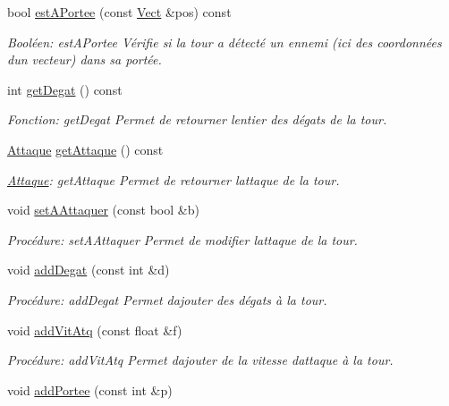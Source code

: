 \begin{DoxyCompactItemize}
bool \hyperlink{classTour_ad9f4d42370374f373f48f7d0fb36559a}{est\+A\+Portee} (const \hyperlink{classVect}{Vect} \&pos) const
\begin{DoxyCompactList}\small\item\em Booléen\+: est\+A\+Portee Vérifie si la tour a détecté un ennemi (ici des coordonnées d\textquotesingle{}un vecteur) dans sa portée. \end{DoxyCompactList}\item 
int \hyperlink{classTour_a029767fb4e9eb78f8f9d3f1d824281a0}{get\+Degat} () const
\begin{DoxyCompactList}\small\item\em Fonction\+: get\+Degat Permet de retourner l\textquotesingle{}entier des dégats de la tour. \end{DoxyCompactList}\item 
\hyperlink{classAttaque}{Attaque} \hyperlink{classTour_adba4672afe3b3c71689f3303007caa59}{get\+Attaque} () const
\begin{DoxyCompactList}\small\item\em \hyperlink{classAttaque}{Attaque}\+: get\+Attaque Permet de retourner l\textquotesingle{}attaque de la tour. \end{DoxyCompactList}\item 
void \hyperlink{classTour_ab1f278b35be5caa0694a1d8ec8b152ba}{set\+A\+Attaquer} (const bool \&b)
\begin{DoxyCompactList}\small\item\em Procédure\+: set\+A\+Attaquer Permet de modifier l\textquotesingle{}attaque de la tour. \end{DoxyCompactList}\item 
void \hyperlink{classTour_a928b2a239f9c5addd9e2a1f692a10ebb}{add\+Degat} (const int \&d)
\begin{DoxyCompactList}\small\item\em Procédure\+: add\+Degat Permet d\textquotesingle{}ajouter des dégats à la tour. \end{DoxyCompactList}\item 
void \hyperlink{classTour_a49e73c0dc4bd90c3004be2c95693142a}{add\+Vit\+Atq} (const float \&f)
\begin{DoxyCompactList}\small\item\em Procédure\+: add\+Vit\+Atq Permet d\textquotesingle{}ajouter de la vitesse d\textquotesingle{}attaque à la tour. \end{DoxyCompactList}\item 
void \hyperlink{classTour_a948e22c8003e63cc9a705787a421262d}{add\+Portee} (const int \&p)

\end{DoxyCompactItemize}
